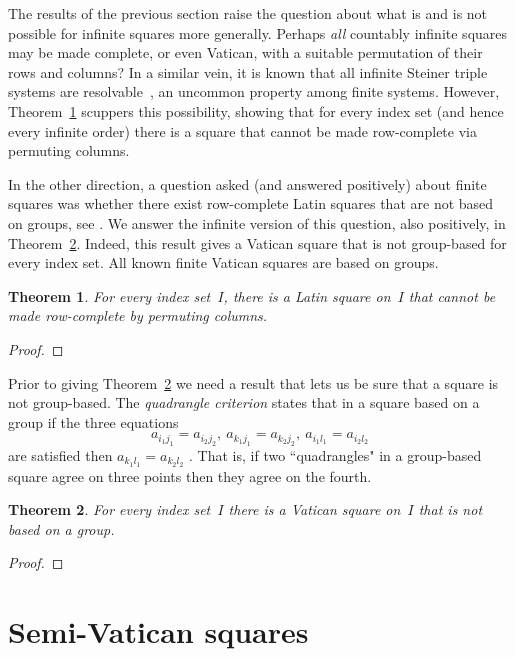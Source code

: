 \documentclass[12pt,a4paper]{article}
\newtheorem{thm}{Theorem}[section]
\begin{document}
The results of the previous section raise the question about what is and is not possible for infinite squares more generally.   Perhaps {\em all} countably infinite squares may be made complete, or even Vatican, with a suitable permutation of their rows and columns?   In a similar vein, it is known that all infinite Steiner triple systems are resolvable~\cite{DHW14}, an uncommon property among finite systems. However, Theorem~\ref{th:notrcls} scuppers this possibility, showing that for every index set (and hence every infinite order) there is a square that cannot be made row-complete via permuting columns.

In the other direction, a question asked (and answered positively) about finite squares was whether there exist row-complete Latin squares that are not based on groups, see \cite{CE91, DK15, Owens76}.  We answer the infinite version of this question, also positively, in Theorem~\ref{th:infvat}.  Indeed, this result gives a Vatican square that is not group-based for every index set.   All known finite Vatican squares are based on groups.

\begin{thm}\label{th:notrcls}
For every index set~$I$, there is a Latin square on~$I$ that cannot be made row-complete by permuting columns.
\end{thm}

\begin{proof}

\end{proof}



Prior to giving Theorem~\ref{th:infvat} we need a result that lets us be sure that a square is not group-based.  The {\em quadrangle criterion} states that in a square based on a group if the three equations
$$a_{i_1j_1} = a_{i_2j_2}, \ a_{k_1j_1} = a_{k_2j_2}, \ a_{i_1l_1} = a_{i_2l_2}$$
are satisfied then $a_{k_1l_1} = a_{k_2l_2}$ \cite[Theorem~1.2.1]{DK15}.  That is, if two ``quadrangles" in a group-based square agree on three points then they agree on the fourth.


\begin{thm}\label{th:infvat}
For every index set~$I$ there is a Vatican square on~$I$ that is not based on a  group.
\end{thm}

\begin{proof}

\end{proof}


\section{Semi-Vatican squares}\label{sec:semivat}
\end{document}
